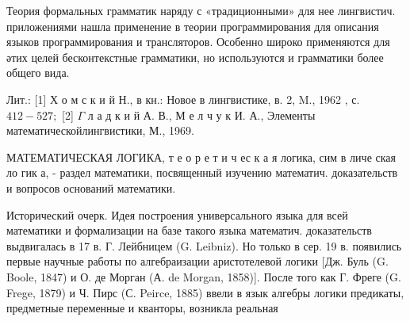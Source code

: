 \documentclass[10pt]{article}
\begin{document}
Теория формальных грамматик наряду с «традиционными» для нее лингвистич. приложениями нашла применение в теории программирования для описания языков программирования и трансляторов. Особенно широко применяются для әтих целей бесконтекстные грамматики, но используются и грамматики более общего вида.



Лит.: [1] Х о м с к и й Н., в кн.: Новое в лингвистике, в. 2, M., 1962 , с. $412-527 ;$ [2] $\Gamma$ л а д к и й А. В., М е л ч у к И. А., Элементы математическойлингвистики, М., 1969.



МАТЕМАТИЧЕСКАЯ ЛОГИКА, т е о р е т и ч ес к а я логика, сим в личе ская ло гик а, - раздел математики, посвященный изучению математич. доказательств и вопросов оснований математики.



Исторический очерк. Идея построения универсального языка для всей математики и формализации на базе такого языка математич. доказательств выдвигалась в 17 в. Г. Лейбницем (G. Leibniz). Но только в сер. 19 в. появились первые научные работы по алгебраизации аристотелевой логики [Дж. Буль (G. Boole, 1847) и О. де Морган (А. de Morgan, 1858)]. После того как Г. Фреге (G. Frege, 1879) и Ч. Пирс (С. Peirce, 1885) ввели в язык алгебры логики предикаты, предметные переменные и кванторы, возникла реальная
\end{document}
